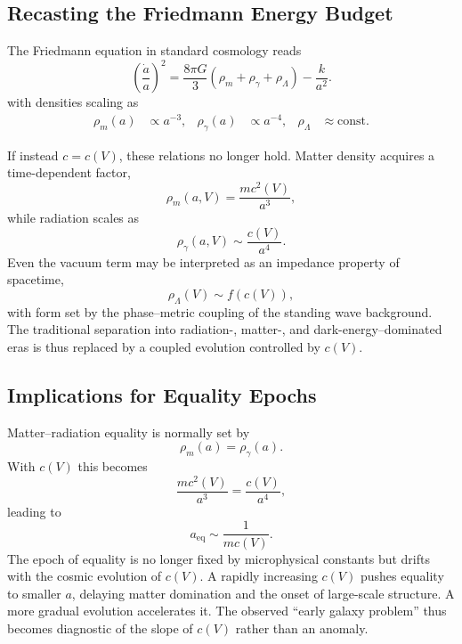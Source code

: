 \documentclass[12pt]{article}
\begin{document}
\subsection{Recasting the Friedmann Energy Budget}

The Friedmann equation in standard cosmology reads
\begin{equation}
\left(\frac{\dot{a}}{a}\right)^{2} = \frac{8 \pi G}{3} \left( \rho_{m} + \rho_{\gamma} + \rho_{\Lambda} \right) - \frac{k}{a^{2}} .
\end{equation}
with densities scaling as
\begin{align}
\rho_{m}(a) &\propto a^{-3}, &
\rho_{\gamma}(a) &\propto a^{-4}, &
\rho_{\Lambda} &\approx \text{const}.
\end{align}

If instead $c = c(V)$, these relations no longer hold. Matter density acquires a time-dependent factor,
\begin{equation}
\rho_{m}(a, V) = \frac{m c^{2}(V)}{a^{3}} ,
\end{equation}
while radiation scales as
\begin{equation}
\rho_{\gamma}(a, V) \sim \frac{c(V)}{a^{4}} .
\end{equation}
Even the vacuum term may be interpreted as an impedance property of spacetime,
\begin{equation}
\rho_{\Lambda}(V) \sim f\!\left(c(V)\right),
\end{equation}
with form set by the phase–metric coupling of the standing wave background. The traditional separation into radiation-, matter-, and dark-energy–dominated eras is thus replaced by a coupled evolution controlled by $c(V)$.

\subsection{Implications for Equality Epochs}

Matter–radiation equality is normally set by
\begin{equation}
\rho_{m}(a) = \rho_{\gamma}(a) .
\end{equation}
With $c(V)$ this becomes
\begin{equation}
\frac{m c^{2}(V)}{a^{3}} = \frac{c(V)}{a^{4}} ,
\end{equation}
leading to
\begin{equation}
a_{\text{eq}} \sim \frac{1}{m c(V)} .
\end{equation}
The epoch of equality is no longer fixed by microphysical constants but drifts with the cosmic evolution of $c(V)$. A rapidly increasing $c(V)$ pushes equality to smaller $a$, delaying matter domination and the onset of large-scale structure. A more gradual evolution accelerates it. The observed ``early galaxy problem'' thus becomes diagnostic of the slope of $c(V)$ rather than an anomaly.
\end{document}
